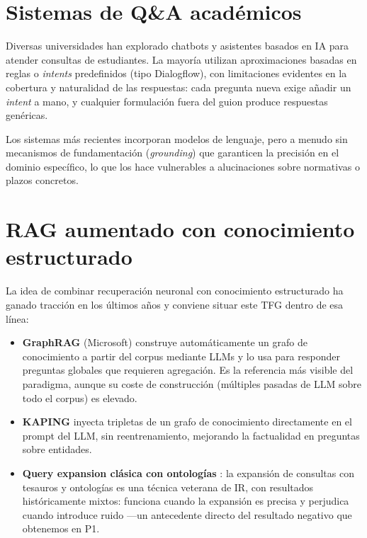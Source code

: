 \documentclass[12pt, a4paper, twoside]{report}
\begin{document}
\section{Sistemas de Q\&A acad\'emicos}

Diversas universidades han explorado chatbots y asistentes basados en IA para atender consultas de estudiantes. La mayor\'ia utilizan aproximaciones basadas en reglas o \textit{intents} predefinidos (tipo Dialogflow), con limitaciones evidentes en la cobertura y naturalidad de las respuestas: cada pregunta nueva exige a\~nadir un \textit{intent} a mano, y cualquier formulaci\'on fuera del guion produce respuestas gen\'ericas.

Los sistemas m\'as recientes incorporan modelos de lenguaje, pero a menudo sin mecanismos de fundamentaci\'on (\textit{grounding}) que garanticen la precisi\'on en el dominio espec\'ifico, lo que los hace vulnerables a alucinaciones sobre normativas o plazos concretos.

\section{RAG aumentado con conocimiento estructurado}

La idea de combinar recuperaci\'on neuronal con conocimiento estructurado ha ganado tracci\'on en los \'ultimos a\~nos y conviene situar este TFG dentro de esa l\'inea:

\begin{itemize}
  \item \textbf{GraphRAG} \cite{edge2024graphrag} (Microsoft) construye autom\'aticamente un grafo de conocimiento a partir del corpus mediante LLMs y lo usa para responder preguntas globales que requieren agregaci\'on. Es la referencia m\'as visible del paradigma, aunque su coste de construcci\'on (m\'ultiples pasadas de LLM sobre todo el corpus) es elevado.
  \item \textbf{KAPING} \cite{baek2023kaping} inyecta tripletas de un grafo de conocimiento directamente en el prompt del LLM, sin reentrenamiento, mejorando la factualidad en preguntas sobre entidades.
  \item \textbf{Query expansion cl\'asica con ontolog\'ias} \cite{bhogal2007review}: la expansi\'on de consultas con tesauros y ontolog\'ias es una t\'ecnica veterana de IR, con resultados hist\'oricamente mixtos: funciona cuando la expansi\'on es precisa y perjudica cuando introduce ruido ---un antecedente directo del resultado negativo que obtenemos en P1.
\end{itemize}
\end{document}
